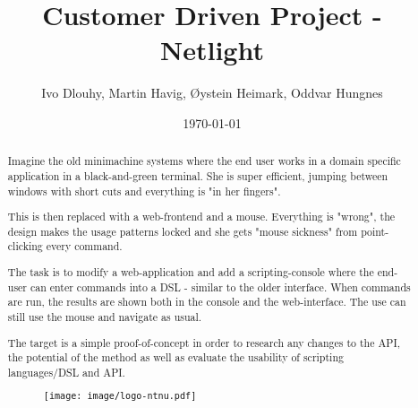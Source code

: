 \documentclass[10pt,a4paper,oneside]{report}
\begin{document}
\title{Customer Driven Project - Netlight}
\author{Ivo Dlouhy, Martin Havig, Øystein Heimark, Oddvar Hungnes}
\date{\today}
\maketitle



\begin{abstract}

Imagine the old minimachine systems where the end user works in a domain specific application in a black-and-green terminal. She is super efficient, jumping between windows with short cuts and everything is "in her fingers".
 
This is then replaced with a web-frontend and a mouse. Everything is "wrong", the design makes the usage patterns locked and she gets "mouse sickness" from point-clicking every command.
 
The task is to modify a web-application and add a scripting-console where the end-user can enter commands into a DSL - similar to the older interface. When commands are run, the results are shown both in the console and the web-interface. The use can still use the mouse and navigate as usual.
 
The target is a simple proof-of-concept in order to research any changes to the API, the potential of the method as well as evaluate the usability of scripting languages/DSL and API.

\begin{figure}
\centering
\texttt{[image: image/logo-ntnu.pdf]}
\end{figure}

\end{abstract}

\setcounter{tocdepth}{4}
\tableofcontents
\clearpage
\listoffigures


\end{document}
